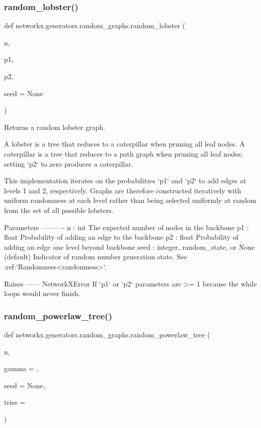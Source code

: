 \subsubsection{\texorpdfstring{random\+\_\+lobster()}{random\_lobster()}}
{\footnotesize\ttfamily def networkx.\+generators.\+random\+\_\+graphs.\+random\+\_\+lobster (\begin{DoxyParamCaption}\item[{}]{n,  }\item[{}]{p1,  }\item[{}]{p2,  }\item[{}]{seed = {\ttfamily None} }\end{DoxyParamCaption})}

\begin{DoxyVerb}Returns a random lobster graph.

A lobster is a tree that reduces to a caterpillar when pruning all
leaf nodes. A caterpillar is a tree that reduces to a path graph
when pruning all leaf nodes; setting `p2` to zero produces a caterpillar.

This implementation iterates on the probabilities `p1` and `p2` to add
edges at levels 1 and 2, respectively. Graphs are therefore constructed
iteratively with uniform randomness at each level rather than being selected
uniformly at random from the set of all possible lobsters.

Parameters
----------
n : int
    The expected number of nodes in the backbone
p1 : float
    Probability of adding an edge to the backbone
p2 : float
    Probability of adding an edge one level beyond backbone
seed : integer, random_state, or None (default)
    Indicator of random number generation state.
    See :ref:`Randomness<randomness>`.

Raises
------
NetworkXError
    If `p1` or `p2` parameters are >= 1 because the while loops would never finish.
\end{DoxyVerb}
 \mbox{\label{namespacenetworkx_1_1generators_1_1random__graphs_adee8cf3717a21fcf18caa925ae154225}} 
\subsubsection{\texorpdfstring{random\+\_\+powerlaw\+\_\+tree()}{random\_powerlaw\_tree()}}
{\footnotesize\ttfamily def networkx.\+generators.\+random\+\_\+graphs.\+random\+\_\+powerlaw\+\_\+tree (\begin{DoxyParamCaption}\item[{}]{n,  }\item[{}]{gamma = {},  }\item[{}]{seed = {\ttfamily None},  }\item[{}]{tries = {} }\end{DoxyParamCaption})}

